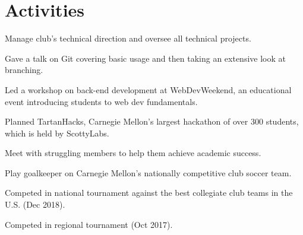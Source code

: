 \documentclass[]{openfont}
\begin{document}
\begin{minipage}[t]{0.59\textwidth}
\sectionsep


\section{Activities} 
\begin{tightemize}
    \item Manage club's technical direction and oversee all technical projects.
    \item Gave a talk on Git covering basic usage and then taking an extensive
        look at branching.
    \item Led a workshop on back-end development at WebDevWeekend, an
        educational event introducing students to web dev fundamentals.
    \item Planned TartanHacks, Carnegie Mellon's largest hackathon of over 300 students, which is held by ScottyLabs.
\end{tightemize}

\sectionsep

\begin{tightemize}
    \item Meet with struggling members to help them achieve academic success.
\end{tightemize}

\sectionsep

\begin{tightemize}
    \item Play goalkeeper on Carnegie Mellon's nationally competitive club soccer team.
    \item Competed in national tournament against the best collegiate club teams
        in the U.S. (Dec 2018).
    \item Competed in regional tournament (Oct 2017).
\end{tightemize}

\sectionsep

\end{minipage} 
\end{document}
